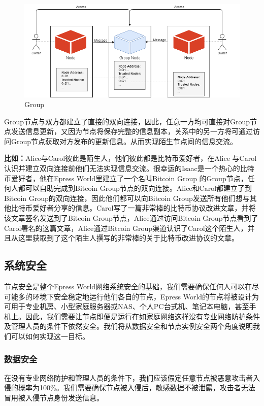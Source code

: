 \documentclass[12pt,a4paper]{extarticle}
\begin{document}
    \begin{figure}[H]
        \centering
        \includegraphics[width=\textwidth]{figures-group.png}
        \caption{Group}
    \end{figure}
    
    Group节点与双方都建立了直接的双向连接，因此，任意一方均可直接对Group节点发送信息更新，又因为节点将保存完整的信息副本，关系中的另一方将可通过访问Group节点获取对方发布的更新信息。从而实现陌生节点间的信息交流。
    \newline
    \begin{blockqt}
    \textbf{比如：}Alice与Carol彼此是陌生人，他们彼此都是比特币爱好者，在Alice
    与Carol认识并建立双向连接前他们无法实现信息交流。很幸运的Isaac是一个热心的比特币爱好者，他在Epress World里建立了一个名叫Bitcoin Group
    的Group节点，任何人都可以自助完成到Bitcoin Group节点的双向连接。Alice和Carol都建立了到Bitcoin Group的双向连接，因此他们都可以向Bitcoin Group发送所有他们想与其他比特币爱好者分享的信息。Carol写了一篇非常棒的比特币协议改进文章，并将该文章签名发送到了Bitcoin Group节点，Alice通过访问Bitcoin Group节点看到了Carol署名的这篇文章，Alice通过Bitcoin Group渠道认识了Carol这个陌生人，并且从这里获取到了这个陌生人撰写的非常棒的关于比特币改进协议的文章。
    \end{blockqt}
\subsection{系统安全}
    节点安全是整个Epress World网络系统安全的基础，我们需要确保任何人可以在尽可能多的环境下安全稳定地运行他们各自的节点，Epress World的节点将被设计为可用于专业机房、小型家庭服务器或NAS、个人PC台式机、笔记本电脑，甚至手机上。因此，我们需要让节点即便是运行在如家庭网络这样没有专业网络防护条件及管理人员的条件下依然安全。我们将从数据安全和节点实例安全两个角度说明我们可以如何实现这一目标。
\subsubsection{数据安全}
    在没有专业网络防护和管理人员的条件下，我们应该假定任意节点被恶意攻击者入侵的概率为100\%。我们需要确保节点被入侵后，敏感数据不被泄露，攻击者无法冒用被入侵节点身份发送信息。
\end{document}
